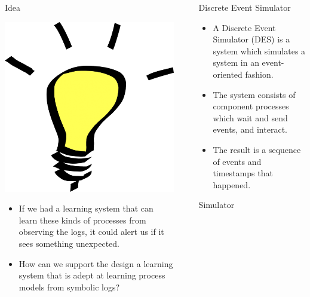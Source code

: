 \documentclass[final]{beamer}
\newlength{\sepwid}
\newlength{\onecolwid}
\begin{document}
\begin{frame}[t]
\begin{columns}[t]
\begin{column}{\onecolwid}
\begin{block}{Idea}
{\centering
\includegraphics[width=4 cm,keepaspectratio=true]{./bulb.png}\par
}

\begin{itemize}
\item If we had a learning system that can learn these kinds of processes from observing the logs, it could alert us if it sees something unexpected.
\item How can we support the design a learning system that is adept at learning process models from symbolic logs?
\end{itemize}

\end{block}

\end{column}
\begin{column}{\sepwid}\end{column} %

\begin{column}{\onecolwid}

\begin{alertblock}{Discrete Event Simulator}

\begin{itemize}
 \item A Discrete Event Simulator (DES) is a system which simulates a system in an event-oriented fashion.
 \item The system consists of component processes which wait and send events, and interact.
 \item The result is a sequence of events and timestamps that happened.
\end{itemize}


\end{alertblock}

\begin{block}{Simulator}


\end{block}
\end{column}
\end{columns}
\end{frame}
\end{document}

